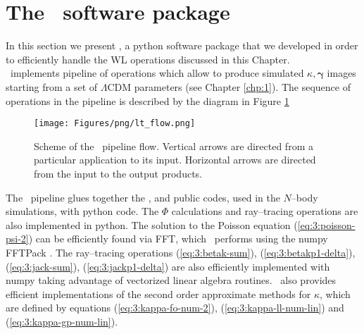 
\section{The \LT\, software package}
\label{sec:3:lt}
In this section we present \LT \citep{lenstools}, a {\sc python} software package that we developed in order to efficiently handle the WL operations discussed in this Chapter. \\ \LT\, implements pipeline of operations which allow to produce simulated $\kappa,\pmb{\gamma}$ images starting from a set of $\Lambda$CDM parameters (see Chapter \ref{chp:1}). The sequence of operations in the pipeline is described by the diagram in Figure \ref{fig:3:lt-flow}  
%
\begin{figure}
\begin{center}
\texttt{[image: Figures/png/lt\_flow.png]}
\end{center}
\caption{Scheme of the \LT\, pipeline flow. Vertical arrows are directed from a particular application to its input. Horizontal arrows are directed from the input to the output products.}
\label{fig:3:lt-flow}
\end{figure}
%
The \LT\, pipeline glues together the ,  and  public codes, used in the $N$--body simulations, with {\sc python} code. The $\Phi$ calculations and ray--tracing operations are also implemented in {\sc python}. The solution to the Poisson equation (\ref{eq:3:poisson-psi-2}) can be efficiently found via FFT, which \LT\, performs using the {\sc numpy} FFTPack \citep{scipy}. The ray--tracing operations (\ref{eq:3:betak-sum}), (\ref{eq:3:betakp1-delta}), (\ref{eq:3:jack-sum}), (\ref{eq:3:jackp1-delta}) are also efficiently implemented with {\sc numpy} taking advantage of vectorized linear algebra routines. \LT\, also provides efficient implementations of the second order approximate methods for $\kappa$, which are defined by equations (\ref{eq:3:kappa-fo-num-2}), (\ref{eq:3:kappa-ll-num-lin}) and (\ref{eq:3:kappa-gp-num-lin}). 

